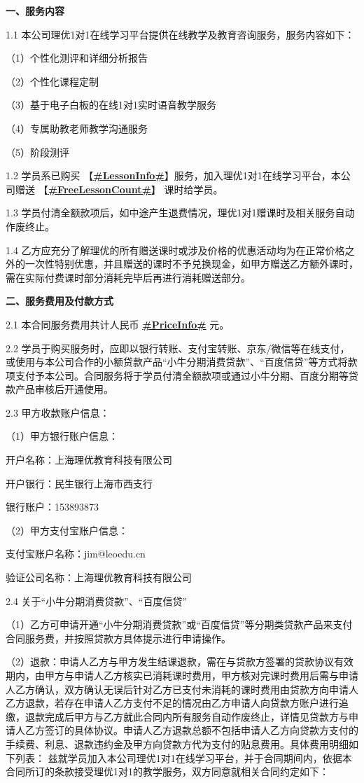 \documentclass {ctexart}
\begin{document}
\textbf{一、服务内容 }

1.1	本公司理优1对1在线学习平台提供在线教学及教育咨询服务，服务内容如下：

（1）个性化测评和详细分析报告	

（2）个性化课程定制

（3）基于电子白板的在线1对1实时语音教学服务	

（4）专属助教老师教学沟通服务

（5）阶段测评

1.2	学员系已购买 【\underline{\textbf{#LessonInfo#}}】服务，加入理优1对1在线学习平台，本公司赠送    【\underline{\textbf{#FreeLessonCount#}}】  课时给学员。

1.3	学员付清全额款项后，如中途产生退费情况，理优1对1赠课时及相关服务自动作废终止。

1.4	乙方应充分了解理优的所有赠送课时或涉及价格的优惠活动均为在正常价格之外的一次性特别优惠，并且赠送的课时不予兑换现金，如甲方赠送乙方额外课时，需在实际付费课时部分消耗完毕后再进行消耗赠送部分。


\newpage
\textbf{二、服务费用及付款方式}

2.1	本合同服务费用共计人民币 \textbf{\underline{#PriceInfo#}} 元。

2.2	学员于购买服务时，应即以银行转账、支付宝转账、京东/微信等在线支付，或使用与本公司合作的小额贷款产品“小牛分期消费贷款”、“百度信贷”等方式将款项支付予本公司。合同服务将于学员付清全额款项或通过小牛分期、百度分期等贷款产品审核后开通使用。

2.3	甲方收款账户信息：

（1）甲方银行账户信息：

开户名称：上海理优教育科技有限公司

开户银行：民生银行上海市西支行

银行账户：153893873

（2）甲方支付宝账户信息：

支付宝账户名称：jim@leoedu.cn

验证公司名称：上海理优教育科技有限公司

2.4	关于“小牛分期消费贷款”、“百度信贷”

（1）乙方可申请开通“小牛分期消费贷款”或“百度信贷”等分期类贷款产品来支付合同服务费，并按照贷款方具体提示进行申请操作。

（2）退款：申请人乙方与甲方发生结课退款，需在与贷款方签署的贷款协议有效期内，由甲方与申请人乙方核实已消耗课时费用，甲方核对完课时费用后需与申请人乙方确认，双方确认无误后针对乙方已支付未消耗的课时费用由贷款方向申请人乙方退款，若存在申请人乙方支付不足的情况由乙方申请人向贷款方账户进行追缴，退款完成后甲方与乙方就此合同内所有服务自动作废终止，详情见贷款方与申请人乙方签订的具体协议。申请人乙方退款总额不包括申请人乙方向贷款方支付的手续费、利息、退款违约金及甲方向贷款方代为支付的贴息费用。具体费用明细如下列表：
兹就学员加入本公司理优1对1在线学习平台，并于合同期间内，依据本合同所订的条款接受理优1对1的教学服务，双方同意就相关合同约定如下：
\end{document}
